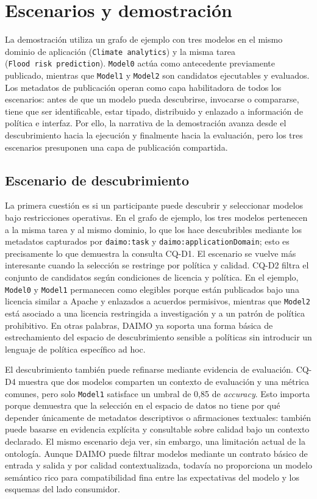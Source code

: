 \documentclass[11pt,a4paper]{article}
\newcommand{\code}[1]{\texttt{#1}}
\newcommand{\cq}[1]{\textsf{#1}}
\begin{document}
\section{Escenarios y demostración}\label{sec:demo}

La demostración utiliza un grafo de ejemplo con tres modelos en el mismo dominio de aplicación (\texttt{Climate\ analytics}) y la misma tarea (\texttt{Flood\ risk\ prediction}). \texttt{Model0} actúa como antecedente previamente publicado, mientras que \texttt{Model1} y \texttt{Model2} son candidatos ejecutables y evaluados. Los metadatos de publicación operan como capa habilitadora de todos los escenarios: antes de que un modelo pueda descubrirse, invocarse o compararse, tiene que ser identificable, estar tipado, distribuido y enlazado a información de política e interfaz. Por ello, la narrativa de la demostración avanza desde el descubrimiento hacia la ejecución y finalmente hacia la evaluación, pero los tres escenarios presuponen una capa de publicación compartida.

\subsection{Escenario de descubrimiento}

La primera cuestión es si un participante puede descubrir y seleccionar modelos bajo restricciones operativas. En el grafo de ejemplo, los tres modelos pertenecen a la misma tarea y al mismo dominio, lo que los hace descubribles mediante los metadatos capturados por \code{daimo:task} y \code{daimo:applicationDomain}; esto es precisamente lo que demuestra la consulta \cq{CQ-D1}. El escenario se vuelve más interesante cuando la selección se restringe por política y calidad. \cq{CQ-D2} filtra el conjunto de candidatos según condiciones de licencia y política. En el ejemplo, \texttt{Model0} y \texttt{Model1} permanecen como elegibles porque están publicados bajo una licencia similar a Apache y enlazados a acuerdos permisivos, mientras que \texttt{Model2} está asociado a una licencia restringida a investigación y a un patrón de política prohibitivo. En otras palabras, DAIMO ya soporta una forma básica de estrechamiento del espacio de descubrimiento sensible a políticas sin introducir un lenguaje de política específico ad hoc.

El descubrimiento también puede refinarse mediante evidencia de evaluación. \cq{CQ-D4} muestra que dos modelos comparten un contexto de evaluación y una métrica comunes, pero solo \texttt{Model1} satisface un umbral de 0,85 de \emph{accuracy}. Esto importa porque demuestra que la selección en el espacio de datos no tiene por qué depender únicamente de metadatos descriptivos o afirmaciones textuales: también puede basarse en evidencia explícita y consultable sobre calidad bajo un contexto declarado. El mismo escenario deja ver, sin embargo, una limitación actual de la ontología. Aunque DAIMO puede filtrar modelos mediante un contrato básico de entrada y salida y por calidad contextualizada, todavía no proporciona un modelo semántico rico para compatibilidad fina entre las expectativas del modelo y los esquemas del lado consumidor.
\end{document}
